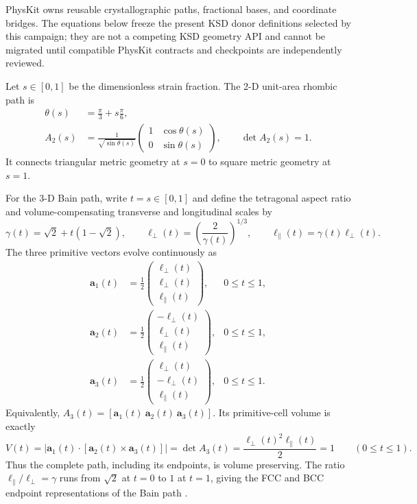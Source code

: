 \documentclass[11pt]{article}
\begin{document}
PhysKit owns reusable crystallographic paths, fractional bases, and coordinate bridges.
The equations below freeze the present KSD donor definitions selected by this campaign;
they are not a competing KSD geometry API and cannot be migrated until compatible
PhysKit contracts and checkpoints are independently reviewed.

Let $s\in[0,1]$ be the dimensionless strain fraction. The 2-D unit-area rhombic path is
\begin{align}
 \theta(s)&=\frac\pi3+s\frac\pi6,\\
 A_2(s)&=\frac{1}{\sqrt{\sin\theta(s)}}
 \begin{pmatrix}
 1&\cos\theta(s)\\
 0&\sin\theta(s)
 \end{pmatrix},
 \qquad \det A_2(s)=1.
 \label{eq:strain-rhombic-path}
\end{align}
It connects triangular metric geometry at $s=0$ to square metric geometry at $s=1$.

For the 3-D Bain path, write $t=s\in[0,1]$ and define the tetragonal aspect ratio
and volume-compensating transverse and longitudinal scales by
\begin{equation}
 \gamma(t)=\sqrt2+t(1-\sqrt2),
 \qquad
 \ell_\perp(t)=\left(\frac{2}{\gamma(t)}\right)^{1/3},
 \qquad
 \ell_\parallel(t)=\gamma(t)\ell_\perp(t).
 \label{eq:strain-bain-scales}
\end{equation}
The three primitive vectors evolve continuously as
\begin{align}
 \mathbf a_1(t)&=\frac12
 \begin{pmatrix}\ell_\perp(t)\\\ell_\perp(t)\\\ell_\parallel(t)\end{pmatrix},
 &0\le t\le1,\\
 \mathbf a_2(t)&=\frac12
 \begin{pmatrix}-\ell_\perp(t)\\\ell_\perp(t)\\\ell_\parallel(t)\end{pmatrix},
 &0\le t\le1,\\
 \mathbf a_3(t)&=\frac12
 \begin{pmatrix}\ell_\perp(t)\\-\ell_\perp(t)\\\ell_\parallel(t)\end{pmatrix},
 &0\le t\le1.
 \label{eq:strain-bain-vectors}
\end{align}
Equivalently,
$A_3(t)=[\mathbf a_1(t)\ \mathbf a_2(t)\ \mathbf a_3(t)]$. Its primitive-cell volume
is exactly
\begin{equation}
 V(t)=\left|\mathbf a_1(t)\cdot
 [\mathbf a_2(t)\times\mathbf a_3(t)]\right|
 =\det A_3(t)
 =\frac{\ell_\perp(t)^2\ell_\parallel(t)}{2}=1
 \qquad (0\le t\le1).
 \label{eq:strain-bain-volume-invariant}
\end{equation}
Thus the complete path, including its endpoints, is volume preserving. The ratio
$\ell_\parallel/\ell_\perp=\gamma$ runs from $\sqrt2$ at $t=0$ to $1$ at $t=1$,
giving the FCC and BCC endpoint representations of the Bain path
\cite{Bain1924Martensite}.
\end{document}
